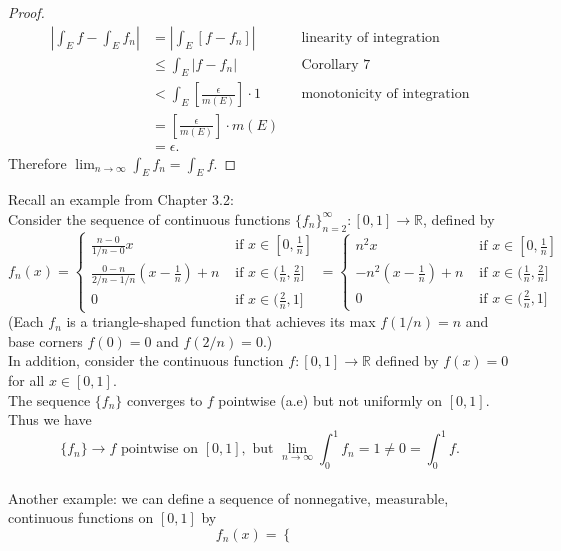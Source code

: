 \begin{flushleft}
\begin{proof}
        \begin{align*}
            |\int_Ef-\int_Ef_n|&=|\int_E[f-f_n]|&&\text{linearity of integration}\\
            &\le\int_E|f-f_n|&&\text{Corollary 7}\\
            &<\int_E[\frac{\epsilon}{m(E)}]\cdot1&&\text{monotonicity of integration}\\
            &=[\frac{\epsilon}{m(E)}]\cdot m(E)\\
            &=\epsilon.
        \end{align*}
        Therefore $\lim_{n\to\infty}\int_Ef_n=\int_Ef$.
    \end{proof}
    Recall an example from Chapter 3.2:
        \\Consider the sequence of continuous functions $\{f_n\}_{n=2}^\infty:[0,1]\to\mathbb{R}$, defined by
        \[ 
		f_n(x) =
            \begin{cases} 
                \frac{n-0}{1/n-0}x& \text{ if } x \in [0,\frac{1}{n}]\\
                \frac{0-n}{2/n-1/n}(x-\frac{1}{n})+n & \text{ if } x \in (\frac{1}{n},\frac{2}{n}]\\
                0& \text{ if } x \in (\frac{2}{n},1]
            \end{cases}
            =
            \begin{cases} 
                n^2x& \text{ if } x \in [0,\frac{1}{n}]\\
                -n^2(x-\frac{1}{n})+n & \text{ if } x \in (\frac{1}{n},\frac{2}{n}]\\
                0& \text{ if } x \in (\frac{2}{n},1]
            \end{cases}
	    \]
        (Each $f_n$ is a triangle-shaped function that achieves its max $f(1/n)=n$ and base corners $f(0)=0$ and $f(2/n)=0$.)\\
        In addition, consider the continuous function $f:[0,1]\to\mathbb{R}$ defined by $f(x)=0$ for all $x\in[0,1]$.\\\bigskip
        The sequence $\{f_n\}$ converges to $f$ pointwise (a.e) but not uniformly on $[0,1]$.
        \\Thus we have
        \[
            \{f_n\}\to f\text{ pointwise on }[0,1],\text{ but }\lim_{n\to\infty}\int_0^1f_n=1\neq0=\int_0^1f.
        \]
        \\Another example: we can define a sequence of nonnegative, measurable, continuous functions on $[0,1]$ by
        \[
            f_n(x)=
            \begin{cases}

\end{cases}\]
\end{flushleft}
